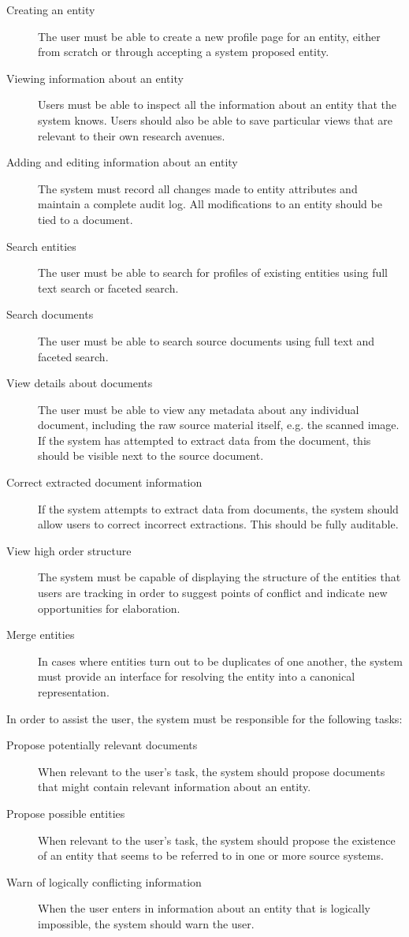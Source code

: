 \documentclass[format=siggraph, review=true]{acmart}
\begin{document}
\begin{description}
\item[Creating an entity] The user must be able to create a new profile
  page for an entity, either from scratch or through accepting a
  system proposed entity.
\item[Viewing information about an entity] Users must be able to inspect
  all the information about an entity that the system knows. Users should also
  be able to save particular views that are relevant to their own research
  avenues.
\item[Adding and editing information about an entity] The system must
  record all changes made to entity attributes and maintain a
  complete audit log. All modifications to an entity should be tied to
  a document.
\item[Search entities] The user must be able to search for profiles of
  existing entities using full text search or faceted search.
\item[Search documents] The user must be able to search source documents
  using full text and faceted search.
\item[View details about documents] The user must be able to view any
  metadata about any individual document, including the raw source material
  itself, e.g. the scanned image. If the system has attempted
  to extract data from the document, this should be visible next to
  the source document.
\item[Correct extracted document information] If the system attempts
  to extract data from documents, the system should allow users to
  correct incorrect extractions. This should be fully auditable.
\item[View high order structure] The system must be capable of displaying the
  structure of the entities that users are tracking in order to suggest points of
  conflict and indicate new opportunities for elaboration.
\item[Merge entities] In cases where entities turn out to be duplicates of one
  another, the system must provide an interface for resolving the entity into
  a canonical representation.
\end{description}

In order to assist the user, the system must be responsible for the
following tasks:

\begin{description}
\item[Propose potentially relevant documents] When relevant to the
  user's task, the system should propose documents that might
  contain relevant information about an entity.
\item[Propose possible entities] When relevant to the user's task, the
  system should propose the existence of an entity that seems to be
  referred to in one or more source systems.
\item[Warn of logically conflicting information] When the user enters in
  information about an entity that is logically impossible, the system
  should warn the user.
\end{description}
\end{document}
